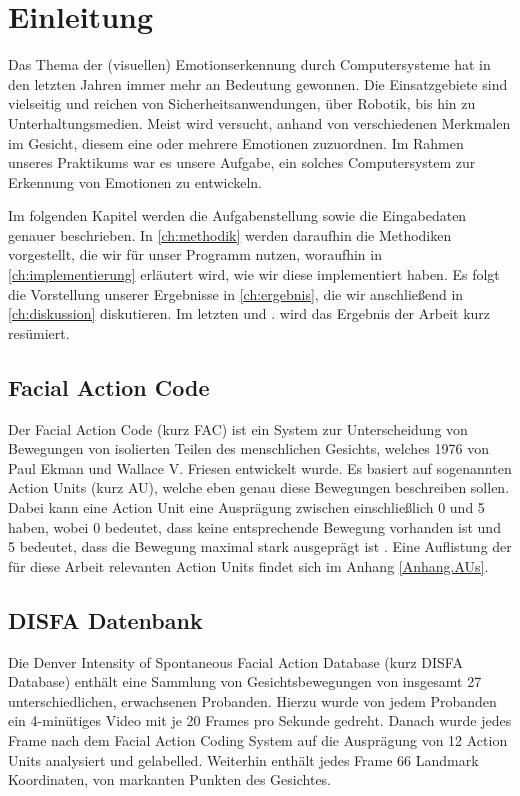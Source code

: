 \chapter{Einleitung}
\label{ch:einleitung}

Das Thema der (visuellen) Emotionserkennung durch Computersysteme hat in den letzten Jahren immer mehr an Bedeutung gewonnen.
Die Einsatzgebiete sind vielseitig und reichen von Sicherheitsanwendungen, über Robotik, bis hin zu Unterhaltungsmedien.
Meist wird versucht, anhand von verschiedenen Merkmalen im Gesicht, diesem eine oder mehrere Emotionen zuzuordnen. Im Rahmen
unseres Praktikums war es unsere Aufgabe, ein solches Computersystem zur Erkennung von Emotionen zu entwickeln.

Im folgenden Kapitel werden die Aufgabenstellung sowie die Eingabedaten genauer beschrieben.
In \cref{ch:methodik} werden daraufhin die Methodiken vorgestellt, die wir für unser Programm nutzen, woraufhin in \cref{ch:implementierung} erläutert wird,
wie wir diese implementiert haben. Es folgt die Vorstellung unserer
Ergebnisse in \cref{ch:ergebnis}, die wir anschließend in \cref{ch:diskussion}
diskutieren. Im letzten und .  wird das Ergebnis der Arbeit kurz resümiert.

\section{Facial Action Code}
Der Facial Action Code (kurz FAC) ist ein System zur Unterscheidung von Bewegungen von isolierten Teilen des menschlichen Gesichts, welches
1976 von Paul Ekman und Wallace V. Friesen entwickelt wurde. Es basiert auf sogenannten Action Units (kurz AU), welche eben genau diese Bewegungen
beschreiben sollen. Dabei kann eine Action Unit eine Ausprägung zwischen einschließlich 0 und 5 haben, wobei 0 bedeutet, dass keine entsprechende
Bewegung vorhanden ist und 5 bedeutet, dass die Bewegung maximal stark ausgeprägt ist \cite{ekman}. Eine Auflistung der für diese Arbeit relevanten Action Units
findet sich im Anhang \ref{Anhang.AUs}.

\section{DISFA Datenbank}
Die Denver Intensity of Spontaneous Facial Action Database (kurz DISFA Database) enthält eine Sammlung von Gesichtsbewegungen von insgesamt
27 unterschiedlichen, erwachsenen Probanden. Hierzu wurde von jedem Probanden ein 4-minütiges Video mit je 20 Frames pro Sekunde gedreht.
Danach wurde jedes Frame nach dem Facial Action Coding System auf die Ausprägung von 12 Action Units analysiert und gelabelled.\newline
Weiterhin enthält jedes Frame 66 Landmark Koordinaten, von markanten Punkten des Gesichtes.

